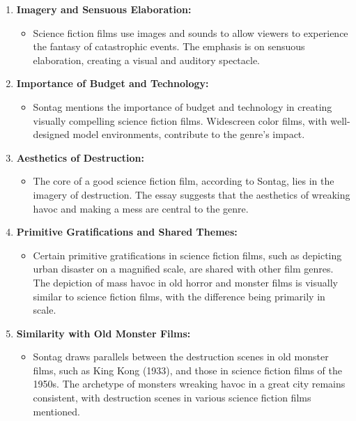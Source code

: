 \documentclass[11pt,fleqn]{book} %
\begin{document}
\begin{enumerate}[label=\arabic*.]
    \item \textbf{Imagery and Sensuous Elaboration:}
    \begin{itemize}
        \item Science fiction films use images and sounds to allow viewers to experience the fantasy of catastrophic events. The emphasis is on sensuous elaboration, creating a visual and auditory spectacle.
    \end{itemize}

    \item \textbf{Importance of Budget and Technology:}
    \begin{itemize}
        \item Sontag mentions the importance of budget and technology in creating visually compelling science fiction films. Widescreen color films, with well-designed model environments, contribute to the genre's impact.
    \end{itemize}

    \item \textbf{Aesthetics of Destruction:}
    \begin{itemize}
        \item The core of a good science fiction film, according to Sontag, lies in the imagery of destruction. The essay suggests that the aesthetics of wreaking havoc and making a mess are central to the genre.
    \end{itemize}
    \item \textbf{Primitive Gratifications and Shared Themes:}
    \begin{itemize}
        \item Certain primitive gratifications in science fiction films, such as depicting urban disaster on a magnified scale, are shared with other film genres. The depiction of mass havoc in old horror and monster films is visually similar to science fiction films, with the difference being primarily in scale.
    \end{itemize}

    \item \textbf{Similarity with Old Monster Films:}
    \begin{itemize}
        \item Sontag draws parallels between the destruction scenes in old monster films, such as King Kong (1933), and those in science fiction films of the 1950s. The archetype of monsters wreaking havoc in a great city remains consistent, with destruction scenes in various science fiction films mentioned.
    \end{itemize}


\end{enumerate}
\end{document}
